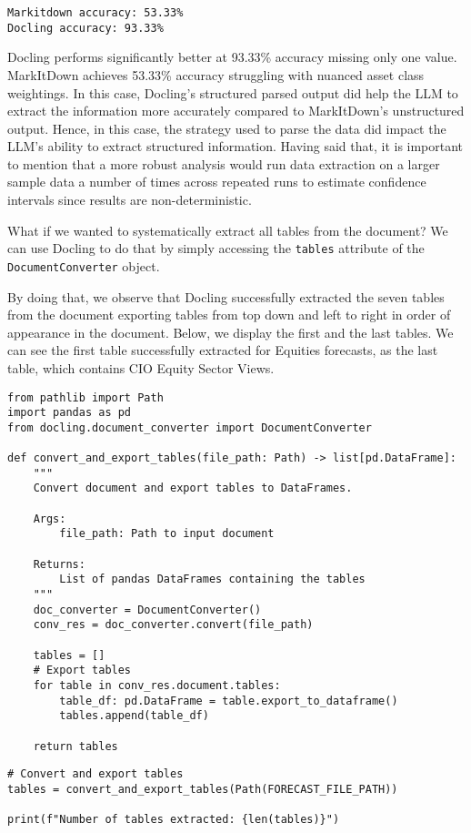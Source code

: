 \begin{verbatim}
Markitdown accuracy: 53.33%
Docling accuracy: 93.33%
\end{verbatim}


Docling performs significantly better at 93.33\% accuracy missing only one value. MarkItDown achieves 53.33\% accuracy struggling with nuanced asset class weightings. In this case, Docling's structured parsed output did help the LLM to extract the information more accurately compared to MarkItDown's unstructured output. Hence, in this case, the strategy used to parse the data did impact the LLM's ability to extract structured information. Having said that, it is important to mention that a more robust analysis would run data extraction on a larger sample data a number of times across repeated runs to estimate confidence intervals since results are non-deterministic.

What if we wanted to systematically extract all tables from the document? We can use Docling to do that by simply accessing the \texttt{tables} attribute of the \texttt{DocumentConverter} object.

By doing that, we observe that Docling successfully extracted the seven tables from the document exporting tables from top down and left to right in order of appearance in the document.
Below, we display the first and the last tables. We can see the first table successfully extracted for Equities forecasts, as the last table, which contains CIO Equity Sector Views.
\begin{verbatim}
from pathlib import Path
import pandas as pd
from docling.document_converter import DocumentConverter

def convert_and_export_tables(file_path: Path) -> list[pd.DataFrame]:
    """
    Convert document and export tables to DataFrames.
    
    Args:
        file_path: Path to input document
        
    Returns:
        List of pandas DataFrames containing the tables
    """
    doc_converter = DocumentConverter()    
    conv_res = doc_converter.convert(file_path)
    
    tables = []
    # Export tables
    for table in conv_res.document.tables:
        table_df: pd.DataFrame = table.export_to_dataframe()
        tables.append(table_df)
    
    return tables
\end{verbatim}

\begin{verbatim}
# Convert and export tables
tables = convert_and_export_tables(Path(FORECAST_FILE_PATH))

print(f"Number of tables extracted: {len(tables)}")
\end{verbatim}

